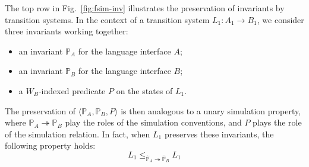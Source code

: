 \documentclass[sigplan,screen,review]{acmart}
\newenvironment{optional}{}{}
\begin{document}
\begin{optional}
\begin{figure*}
  \caption{Simulation with invariants.
    Circles indicate questions, answers and states
    which satisfy the appropriate invariants.
    When the transition system $L_1$ preserves the invariants
    in the way shown in the top row,
    a simulation of $L_1$ by $L_2$ can be established through
    the weakened diagrams shown in the bottom row.
    The resulting simulation uses the convention
    $\mathbb{P}_A \cdot \mathbb{R}_A \twoheadrightarrow
     \mathbb{P}_B \cdot \mathbb{R}_B$,
    ensuring that the environment
    establishes and preserves the appropriate invariants
    on questions and answers.
    The simulation relation $P \cdot R$ then ensures that
    the strengthened assumptions used by the
    weakened simulation diagrams can be satisfied.}
  \label{fig:fsim-inv}
\end{figure*}

The top row in Fig.~\ref{fig:fsim-inv}
illustrates the preservation of invariants by transition systems.
In the context of a transition system
$L_1 : A_1 \rightarrow B_1$,
we consider three invariants working together:
\begin{itemize}
  \item an invariant $\mathbb{P}_A$ for the language interface $A$;
  \item an invariant $\mathbb{P}_B$ for the language interface $B$;
  \item a $W_B$-indexed predicate $P$ on the states of $L_1$.
\end{itemize}
The preservation of
$\langle \mathbb{P}_A, \mathbb{P}_B, P \rangle$
is then analogous to a unary simulation property,
where $\mathbb{P}_A \twoheadrightarrow \mathbb{P}_B$
play the roles of the simulation conventions,
and $P$ plays the role of the simulation relation.
In fact,
when $L_1$ preserves these invariants,
the following property holds:
\[
    L_1 \le_{\hat{\mathbb{P}}_A \twoheadrightarrow \hat{\mathbb{P}}_B} L_1
\]


\end{optional}
\end{document}
